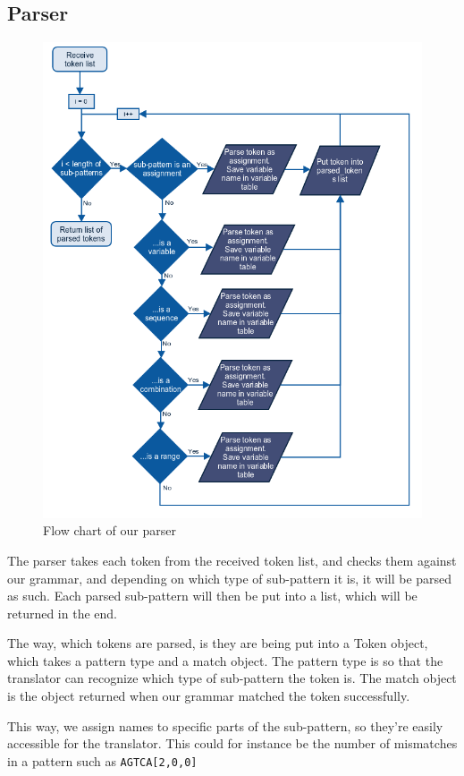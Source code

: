 \documentclass[12pt]{article}
\begin{document}
\subsection{Parser}
\begin{figure}[H]
	\begin{center}
		\includegraphics[scale=0.65]{parser.png}
	\end{center}	
	\caption{Flow chart of our parser}
\end{figure}

The parser takes each token from the received token list, and checks them against our grammar, and depending on which type of sub-pattern it is, it will be parsed as such. Each parsed sub-pattern will then be put into a list, which will be returned in the end.

The way, which tokens are parsed, is they are being put into a Token object, which takes a pattern type and a match object. The pattern type is so that the translator can recognize which type of sub-pattern the token is. The match object is the object returned when our grammar matched the token successfully. 

This way, we assign names to specific parts of the sub-pattern, so they're easily accessible for the translator. This could for instance be the number of mismatches in a pattern such as \texttt{AGTCA[2,0,0]}

\newpage


\nocite{*}

\end{document}
